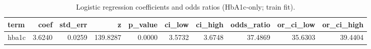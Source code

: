 \begin{table}[H]
\begin{center}
\begin{tabular}{lrrrrrrrrr}
\toprule
term & coef & std_err & z & p_value & ci_low & ci_high & odds_ratio & or_ci_low & or_ci_high \\
\midrule
hba1c & 3.6240 & 0.0259 & 139.8287 & 0.0000 & 3.5732 & 3.6748 & 37.4869 & 35.6303 & 39.4404 \\
\bottomrule
\end{tabular}
\end{center}
\vspace{-5pt}
\caption{Logistic regression coefficients and odds ratios (HbA1c-only; train fit).}
\label{tab:logit_coef_hba1c_only}
\end{table}
